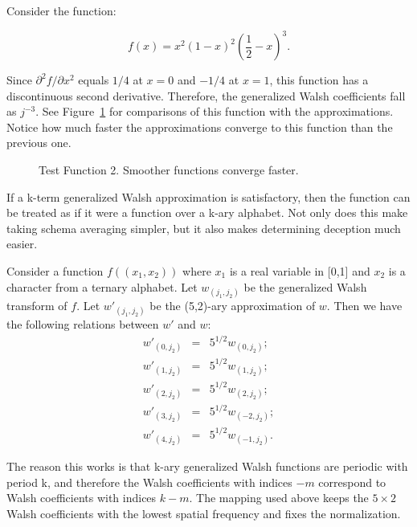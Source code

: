 \begin{example}
Consider the function:
\begin{definition}
\begin{equation}
f(x)=x^2(1-x)^2 (\frac{1}{2}-x)^3.  \label{testfunctiontwo}
\end{equation}
\end{definition}
Since $\partial^2 f/\partial x^2$ equals $1/4$ at $x=0$ and $-1/4$ at $x=1$,
this function has a discontinuous second derivative.  Therefore, the
generalized Walsh coefficients fall as $j^{-3}$.  See Figure~\ref{testfn2}
for comparisons of this function with the approximations.  Notice how
much faster the approximations converge to this function than the previous
one.
\begin{figure}
\caption{Test Function 2.  Smoother functions converge faster.}
\label{testfn2}
\end{figure}
\end{example}
If a k-term generalized Walsh approximation is satisfactory, then
the function can be treated as if it were a function over a k-ary alphabet.  
Not only
does this make taking schema averaging simpler, but it also makes
determining deception much easier.  

\begin{example}
Consider a
function $f((x_1,x_2))$ where $x_1$ is a real variable in [0,1] and
$x_2$ is a character from a ternary alphabet.  Let $w_{(j_1,j_2)}$ be
the generalized Walsh transform of $f$.  Let $w'_{(j_1,j_2)}$ be the
(5,2)-ary approximation of $w$.  Then we have the following relations
between $w'$ and $w$:
\begin{eqnarray}
w'_{(0,j_2)} &=& 5^{1/2} w_{(0,j_2)}; \nonumber \\
w'_{(1,j_2)} &=& 5^{1/2} w_{(1,j_2)}; \nonumber \\
w'_{(2,j_2)} &=& 5^{1/2} w_{(2,j_2)}; \nonumber \\
w'_{(3,j_2)} &=& 5^{1/2} w_{(-2,j_2)}; \nonumber \\
w'_{(4,j_2)} &=& 5^{1/2} w_{(-1,j_2)}.
\end{eqnarray}
\end{example}
The reason this works is that k-ary generalized Walsh functions are
periodic with period k, and therefore the Walsh coefficients with indices
$-m$ correspond to Walsh coefficients with indices $k-m$.  The mapping
used above keeps the $5\times 2$ Walsh coefficients with the lowest spatial
frequency and fixes the normalization.

